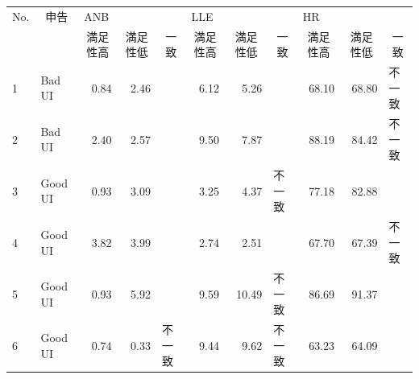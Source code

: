\begin{landscape}
\begin{table}[htbp]
\begin{tabular}{llrrlrrlrrl}
\hline
\multicolumn{1}{c}{No.} & \multicolumn{1}{c}{申告} & \multicolumn{3}{l}{ANB}                                                      & \multicolumn{3}{l}{LLE}                                                      & \multicolumn{3}{l}{HR}                                                       \\ \cline{3-11} 
\multicolumn{1}{c}{}    & \multicolumn{1}{c}{}   & \multicolumn{1}{c}{満足性高} & \multicolumn{1}{c}{満足性低} & \multicolumn{1}{c}{一致} & \multicolumn{1}{c}{満足性高} & \multicolumn{1}{c}{満足性低} & \multicolumn{1}{c}{一致} & \multicolumn{1}{c}{満足性高} & \multicolumn{1}{c}{満足性低} & \multicolumn{1}{c}{一致} \\ \hline
1                       & Bad UI                 & 0.84                     & 2.46                     &                        & 6.12                     & 5.26                     &                        & 68.10                    & 68.80                    & 不一致                    \\
2                       & Bad UI                 & 2.40                     & 2.57                     &                        & 9.50                     & 7.87                     &                        & 88.19                    & 84.42                    & 不一致                    \\
3                       & Good UI                & 0.93                     & 3.09                     &                        & 3.25                     & 4.37                     & 不一致                    & 77.18                    & 82.88                    &                        \\
4                       & Good UI                & 3.82                     & 3.99                     &                        & 2.74                     & 2.51                     &                        & 67.70                    & 67.39                    & 不一致                    \\
5                       & Good UI                & 0.93                     & 5.92                     &                        & 9.59                     & 10.49                    & 不一致                    & 86.69                    & 91.37                    &                        \\
6                       & Good UI                & 0.74                     & 0.33                     & 不一致                    & 9.44                     & 9.62                     & 不一致                    & 63.23                    & 64.09                    &                        \\

\end{tabular}
\end{table}
\end{landscape}
